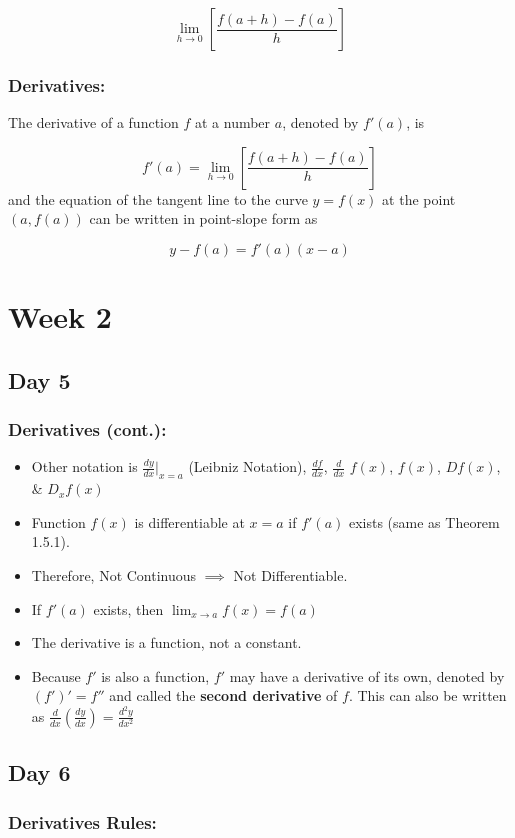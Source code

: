 \documentclass[12pt]{article}
\begin{document}
$$\lim_{h \to 0} \left [ \frac{f(a+h)-f(a)}{h} \right ]$$

\subsubsection{Derivatives:} The derivative of a function $f$ at a number $a$, denoted by $f'(a)$, is 

$$f'(a) = \lim_{h \to 0} \left [ \frac{f(a+h)-f(a)}{h} \right ]$$
and the equation of the tangent line to the curve $y=f(x)$ at the point $(a,f(a))$ can be written in point-slope form as

$$y-f(a)=f'(a)(x-a)$$

\section{Week 2}
\subsection{Day 5}
\subsubsection{Derivatives (cont.):}
\begin{itemize}
    \item Other notation is $\frac{d y}{d x} |_{x=a}$ (Leibniz Notation),  $\frac{d f}{d x}$, $\frac{d}{d x}$ $f(x)$, $f(x)$, $D f(x)$, \& $D_{x} f(x)$
    \item Function $f(x)$ is differentiable at $x=a$ if $f'(a)$ exists (same as Theorem 1.5.1).
    \item Therefore, Not Continuous $\implies$ Not Differentiable.
    \item If $f'(a)$ exists, then $\lim_{x \to a} f(x) = f(a)$
    \item The derivative is a function, not a constant.
    \item Because $f'$ is also a function, $f'$ may have a derivative of its own, denoted by $(f')' = f''$ and called the \textbf{second derivative} of $f$. This can also be written as $\frac{d}{d x} \left ( \frac{d y}{d x} \right ) = \frac{d^2 y}{dx^2}$
\end{itemize}


\subsection{Day 6}
\subsubsection{Derivatives Rules:}
\end{document}
